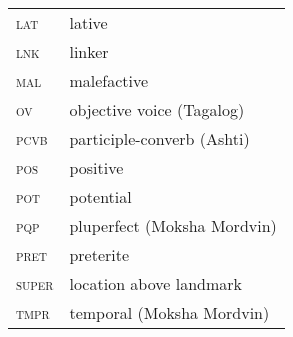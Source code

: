 \documentclass[output=paper]{../langscibook}
\begin{document}
\begin{tabularx}{.45\textwidth}{lQ}
\textsc{lat}& lative\\
\textsc{lnk}& linker\\
\textsc{mal}& malefactive\\
\textsc{ov}& objective voice (Tagalog)\\
\textsc{pcvb}&  participle-converb (Ashti)\\
\textsc{pos} & positive\\ 
\textsc{pot}& potential\\
\textsc{pqp}&  pluperfect (Moksha Mordvin)\\
\textsc{pret}& preterite\\
\textsc{super}& location above landmark\\
\textsc{tmpr}& temporal (Moksha Mordvin)\\
\end{tabularx}
 
\sloppy
\printbibliography[heading=subbibliography,notkeyword=this]
\end{document}
